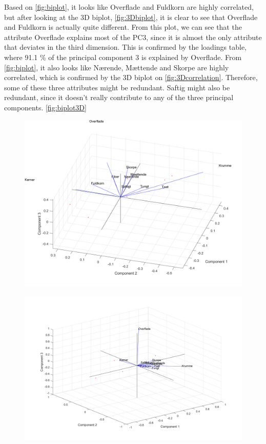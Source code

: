 
Based on \autoref{fig:biplot}, it looks like Overflade and Fuldkorn are highly correlated, but after looking at the 3D biplot, \autoref{fig:3Dbiplot}, it is clear to see that Overflade and Fuldkorn is actually quite different. From this plot, we can see that the attribute Overflade explains most of the PC3, since it is almost the only attribute that deviates in the third dimension. This is confirmed by the loadings table, where 91.1 \% of the principal component 3 is explained by Overflade.
From \autoref{fig:biplot}, it also looks like Nærende, Mættende and Skorpe are highly correlated, which is confirmed by the 3D biplot on \autoref{fig:3Dcorrelation}. Therefore, some of these three attributes might be redundant. Saftig might also be redundant, since it doesn't really contribute to any of the three principal components.
\autoref{fig:biplot3D}

\begin{figure}[H]
\centering
\includegraphics[width =\textwidth]{Figure/biplot_3D_maet}
\caption{}
\label{fig:3Dcorrelation}
\end{figure}
\noindent

\begin{figure}[H]
\centering
\includegraphics[width =\textwidth]{Figure/biplot_3D_std}
\caption{}
\label{fig:3Dbiplot}
\end{figure}
\noindent